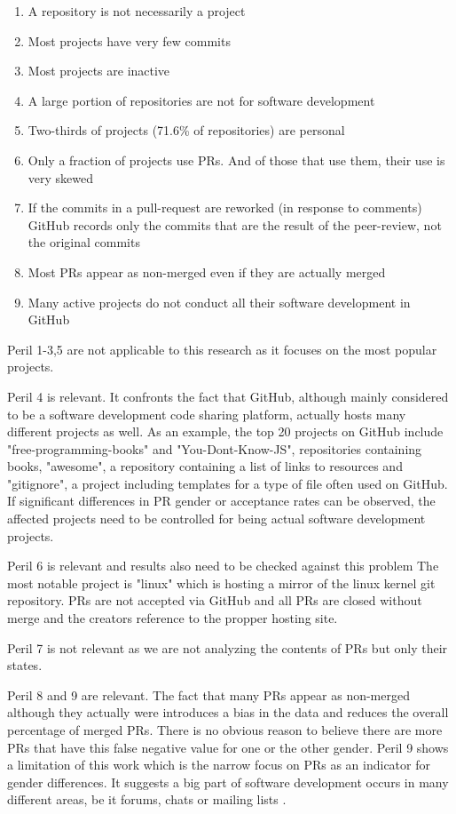 \begin{enumerate}
    \item  A repository is not necessarily a project
    \item  Most projects have very few commits
    \item  Most projects are inactive
    \item  A large portion of repositories are not for software development
    \item  Two-thirds of projects (71.6\% of repositories) are personal
    \item  Only a fraction of projects use \ac{PR}s. And of those that use them, their use is very skewed
    \item  If the commits in a pull-request are reworked (in response to comments) GitHub records only the commits that are the result of the peer-review, not the original commits
    \item  Most \ac{PR}s appear as non-merged even if they are actually merged
    \item  Many active projects do not conduct all their software development in GitHub
\end{enumerate}

Peril 1-3,5 are not applicable to this research as it focuses on the most popular projects.

Peril 4 is relevant. It confronts the fact that GitHub, although mainly considered to be a software development code sharing platform, actually hosts many different projects as well. As an example, the top 20 projects on GitHub include "free-programming-books" and "You-Dont-Know-JS", repositories containing books, "awesome", a repository containing a list of links to resources and "gitignore", a project including templates for a type of file often used on GitHub. If significant differences in \ac{PR} gender or acceptance rates can be observed, the affected projects need to be controlled for being actual software development projects.

Peril 6 is relevant and results also need to be checked against this problem The most notable project is "linux" which is hosting a mirror of the linux kernel git repository. \ac{PR}s are not accepted via GitHub and all \ac{PR}s are closed without merge and the creators reference to the propper hosting site.

Peril 7 is not relevant as we are not analyzing the contents of \ac{PR}s but only their states.

Peril 8 and 9 are relevant. The fact that many \ac{PR}s appear as non-merged although they actually were introduces a bias in the data and reduces the overall percentage of merged \ac{PR}s. There is no obvious reason to believe there are more \ac{PR}s that have this false negative value for one or the other gender. Peril 9 shows a limitation of this work which is the narrow focus on \ac{PR}s as an indicator for gender differences. It suggests a big part of software development occurs in many different areas, be it forums, chats or mailing lists \cite{perils-github:2015}.

